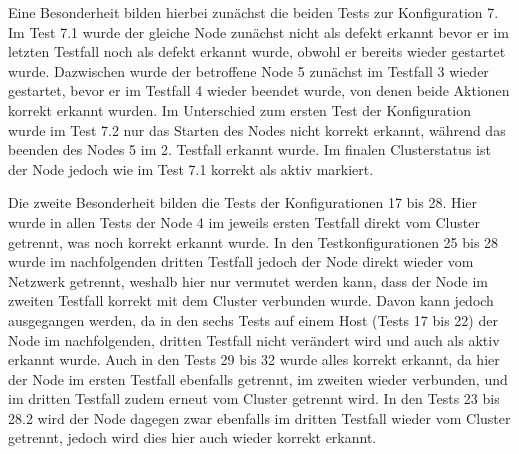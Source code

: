 Eine Besonderheit bilden hierbei zunächst die beiden Tests zur Konfiguration 7.
Im Test 7.1 wurde der gleiche Node zunächst nicht als defekt erkannt bevor er im letzten Testfall noch als defekt erkannt wurde, obwohl er bereits wieder gestartet wurde.
Dazwischen wurde der betroffene Node 5 zunächst im Testfall 3 wieder gestartet, bevor er im Testfall 4 wieder beendet wurde, von denen beide Aktionen korrekt erkannt wurden.
Im Unterschied zum ersten Test der Konfiguration wurde im Test 7.2 nur das Starten des Nodes nicht korrekt erkannt, während das beenden des Nodes 5 im 2. Testfall erkannt wurde.
Im finalen Clusterstatus ist der Node jedoch wie im Test 7.1 korrekt als aktiv markiert.

Die zweite Besonderheit bilden die Tests der Konfigurationen 17 bis 28.
Hier wurde in allen Tests der Node 4 im jeweils ersten Testfall direkt vom Cluster getrennt, was noch korrekt erkannt wurde.
In den Testkonfigurationen 25 bis 28 wurde im nachfolgenden dritten Testfall jedoch der Node direkt wieder vom Netzwerk getrennt, weshalb hier nur vermutet werden kann, dass der Node im zweiten Testfall korrekt mit dem Cluster verbunden wurde.
Davon kann jedoch ausgegangen werden, da in den sechs Tests auf einem Host (Tests 17 bis 22) der Node im nachfolgenden, dritten Testfall nicht verändert wird und auch als aktiv erkannt wurde.
Auch in den Tests 29 bis 32 wurde alles korrekt erkannt, da hier der Node im ersten Testfall ebenfalls getrennt, im zweiten wieder verbunden, und im dritten Testfall zudem erneut vom Cluster getrennt wird.
In den Tests 23 bis 28.2 wird der Node dagegen zwar ebenfalls im dritten Testfall wieder vom Cluster getrennt, jedoch wird dies hier auch wieder korrekt erkannt.
